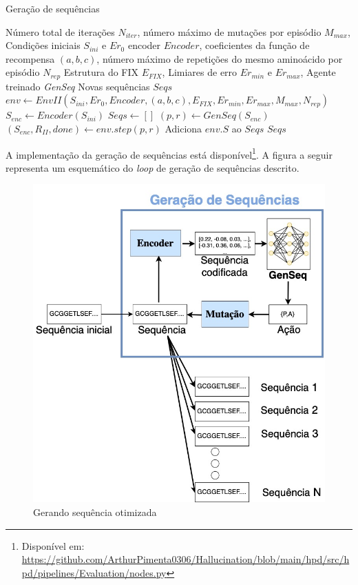 \begin{algorithm}[H]
  \caption{Geração de sequências}
  \label{alg:gerseq}
  \begin{algorithmic}[1]
  \Require Número total de iterações $N_{iter}$, %
  \State         número máximo de mutações por episódio $M_{max}$, %
  \State         Condições iniciais $S_{ini}$ e $Er_{0}$
  \State         encoder $Encoder$,
  \State         coeficientes da função de recompensa $(a, b, c)$,
  \State         número máximo de repetições do mesmo aminoácido por episódio $N_{rep}$
  \State         Estrutura do FIX $E_{FIX}$, 
  \State         Limiares de erro $Er_{min}$ e $Er_{max}$, %
  \State         Agente treinado \textit{GenSeq}
  \Ensure Novas sequências $Seqs$
  \State $env \gets EnvII(S_{ini}, Er_{0}, Encoder, (a, b, c), E_{FIX}, Er_{min},Er_{max}, M_{max}, N_{rep})$ 
  \State $S_{enc} \gets Encoder(S_{ini})$ 
  \State $Seqs \gets []$ 
      \State $(p,r) \gets GenSeq(S_{enc})$ 
      \State $(S_{enc}, R_{II}, done) \gets env.step(p, r)$ 
      \State Adiciona $env.S$ ao $Seqs$ 
  \EndFor
  \State \Return $Seqs$
  \end{algorithmic}
\end{algorithm}

A implementação da geração de sequências está disponível\footnote{Disponível em: \url{https://github.com/ArthurPimenta0306/Hallucination/blob/main/hpd/src/hpd/pipelines/Evaluation/nodes.py}}.
A figura a seguir representa um esquemático do \textit{loop} de geração de sequências descrito.

\begin{figure}[H]
  \centering
  \includegraphics[width=.8\textwidth]{figuras/metodologia-Generating.jpg}
  \caption{Gerando sequência otimizada}
  \label{fig:geradorseq}
\end{figure}










